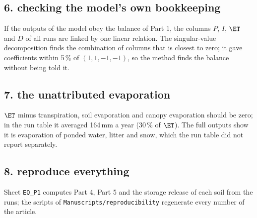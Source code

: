 \subsection{6. checking the model's own bookkeeping}
If the outputs of the model obey the balance of Part 1, the columns $P$, $I$, $\ET$ and $D$ of all runs are linked by one linear relation. The singular-value decomposition finds the combination of columns that is closest to zero; it gave coefficients within 5\,\% of $(1,1,-1,-1)$, so the method finds the balance without being told it.

\subsection{7. the unattributed evaporation}
$\ET$ minus transpiration, soil evaporation and canopy evaporation should be zero; in the run table it averaged 164\,mm a year (30\,\% of $\ET$). The full outputs show it is evaporation of ponded water, litter and snow, which the run table did not report separately.

\subsection{8. reproduce everything}
Sheet \texttt{EQ\_P1} computes Part 4, Part 5 and the storage release of each soil from the runs; the scripts of \nolinkurl{Manuscripts/reproducibility} regenerate every number of the article.

